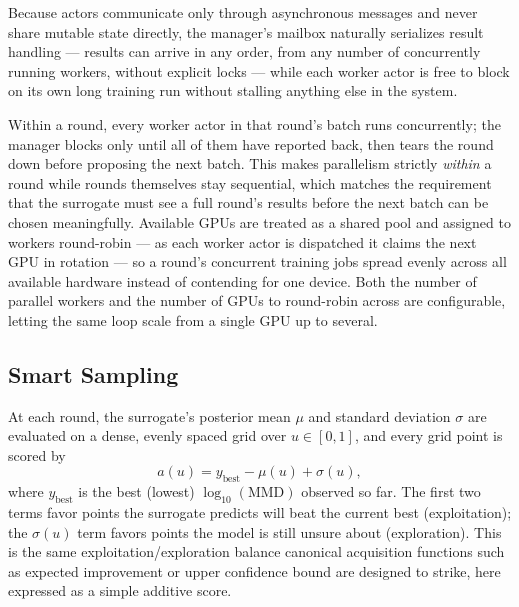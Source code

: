\documentclass[11pt]{article}
\begin{document}
Because actors communicate only through asynchronous messages and never
share mutable state directly, the manager's mailbox naturally serializes
result handling — results can arrive in any order, from any number of
concurrently running workers, without explicit locks — while each worker
actor is free to block on its own long training run without stalling
anything else in the system.

Within a round, every worker actor in that round's batch runs
concurrently; the manager blocks only until all of them have reported
back, then tears the round down before proposing the next batch. This
makes parallelism strictly \emph{within} a round while rounds themselves
stay sequential, which matches the requirement that the surrogate must
see a full round's results before the next batch can be chosen
meaningfully. Available GPUs are treated as a shared pool and assigned to
workers round-robin — as each worker actor is dispatched it claims the
next GPU in rotation — so a round's concurrent training jobs spread
evenly across all available hardware instead of contending for one
device. Both the number of parallel workers and the number of GPUs to
round-robin across are configurable, letting the same loop scale from a
single GPU up to several.

\subsection{Smart Sampling}
\label{sec:sampling}

At each round, the surrogate's posterior mean $\mu$ and standard
deviation $\sigma$ are evaluated on a dense, evenly spaced grid over
$u \in [0,1]$, and every grid point is scored by
\begin{equation}
a(u) = y_{\text{best}} - \mu(u) + \sigma(u),
\end{equation}
where $y_{\text{best}}$ is the best (lowest) $\log_{10}(\mathrm{MMD})$
observed so far. The first two terms favor points the surrogate predicts
will beat the current best (exploitation); the $\sigma(u)$ term favors
points the model is still unsure about (exploration). This is the same
exploitation/exploration balance canonical acquisition functions such as
expected improvement or upper confidence bound are designed to strike,
here expressed as a simple additive score.
\end{document}
